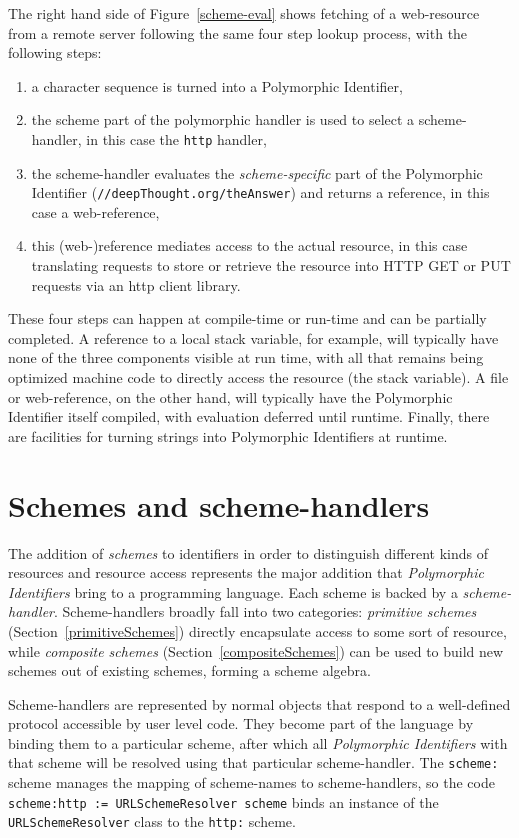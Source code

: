 \documentclass[preprint]{sigplanconf}
\begin{document}
The right hand side of Figure~\ref{scheme-eval} shows fetching of a web-resource from
a remote server following the same four step lookup process, with the following steps:

\begin{enumerate}
\item a character sequence is turned into a Polymorphic Identifier,
\item the scheme part of the polymorphic handler is used to select a scheme-handler, in this case the {\tt http} handler,
\item the scheme-handler evaluates the \emph{scheme-specific} part of the Polymorphic Identifier ({\tt //deepThought.org/theAnswer})
	 and returns a reference, in this case a web-reference,
\item this (web-)reference mediates access to the actual resource, in this case translating requests to store or retrieve the 
	resource into HTTP GET or PUT requests via an http client library.
\end{enumerate}

These four steps can happen at compile-time or run-time and can be partially completed.
A reference to a local stack variable, for example, will typically have none of the
three components visible at run time, with all that remains being optimized 
machine code to directly access the resource (the stack variable).
A file or web-reference, on the other hand, will typically have the Polymorphic Identifier itself
compiled, with evaluation deferred until runtime.  Finally, there are facilities
for turning strings into Polymorphic Identifiers at runtime.


\section{Schemes and scheme-handlers}
\label{schemes}
The addition of \emph{schemes} to identifiers in order to distinguish different kinds of resources
and resource access represents
the major addition that \emph{Polymorphic Identifiers} bring to a programming language.
Each scheme is backed by a \emph{scheme-handler}.  Scheme-handlers broadly fall into two categories:
 \emph{primitive schemes} (Section~\ref{primitiveSchemes})
directly encapsulate access to some sort of resource, while \emph{composite schemes} (Section~\ref{compositeSchemes})
can be used to build new schemes out of existing schemes, forming a scheme algebra.

\sloppy   %

Scheme-handlers are represented by normal objects that respond to a well-defined protocol 
accessible by user level code.  They
become part of the language by binding them to a particular scheme, after which
all \emph{Polymorphic Identifiers} with that scheme will be resolved using that particular scheme-handler.
The {\tt scheme:} scheme manages the mapping of scheme-names to scheme-handlers, so the code 
{\tt scheme:http := URLSchemeResolver scheme} binds an instance of the {\tt URLSchemeResolver} class
to the {\tt http:} scheme.
\end{document}
